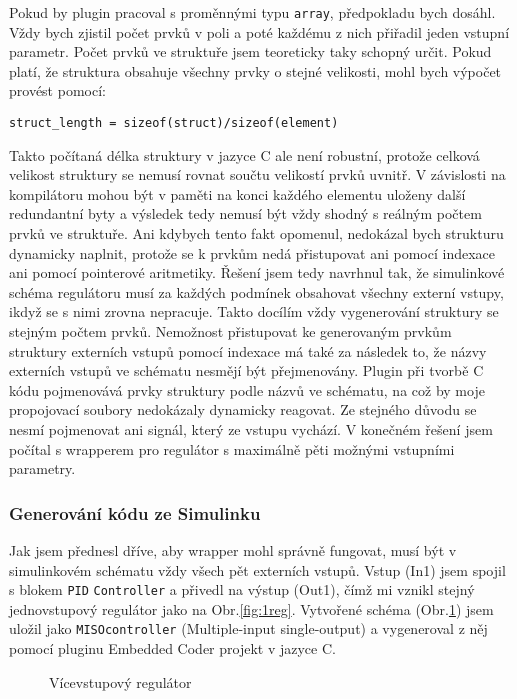 \documentclass[thesis=M,czech,hidelinks]{FITthesis}[2012/06/26]
\begin{document}
Pokud by plugin pracoval s proměnnými typu \texttt{array}, předpokladu bych dosáhl. Vždy bych zjistil počet prvků v poli a poté každému z nich přiřadil jeden vstupní parametr. Počet prvků ve struktuře jsem teoreticky taky schopný určit. Pokud platí, že struktura obsahuje všechny prvky o stejné velikosti, mohl bych výpočet provést pomocí:
\begin{lstlisting}[backgroundcolor=\color{white}, framerule=0pt]
     struct_length = sizeof(struct)/sizeof(element)
\end{lstlisting}
Takto počítaná délka struktury v jazyce C ale není robustní, protože celková velikost struktury se nemusí rovnat součtu velikostí prvků uvnitř. V závislosti na kompilátoru mohou být v paměti na konci každého elementu uloženy další redundantní byty a výsledek tedy nemusí být vždy shodný s reálným počtem prvků ve struktuře. Ani kdybych tento fakt opomenul, nedokázal bych strukturu dynamicky naplnit, protože se k prvkům nedá přistupovat ani pomocí indexace ani pomocí pointerové aritmetiky. 
Řešení jsem tedy navrhnul tak, že simulinkové schéma regulátoru musí za každých podmínek obsahovat všechny externí vstupy, ikdyž se s nimi zrovna nepracuje. Takto docílím vždy vygenerování struktury se stejným počtem prvků. Nemožnost přistupovat ke generovaným prvkům struktury externích vstupů pomocí indexace má také za následek to, že názvy externích vstupů ve schématu nesmějí být přejmenovány. Plugin při tvorbě C kódu pojmenovává prvky struktury podle názvů ve schématu, na což by moje propojovací soubory nedokázaly dynamicky reagovat. Ze stejného důvodu se nesmí pojmenovat ani signál, který ze vstupu vychází. V konečném řešení jsem počítal s wrapperem pro regulátor s maximálně pěti možnými vstupními parametry.

\subsubsection*{Generování kódu ze Simulinku}
Jak jsem přednesl dříve, aby wrapper mohl správně fungovat, musí být v simulinkovém schématu vždy všech pět externích vstupů. Vstup (In1) jsem spojil s blokem \texttt{PID} \texttt{Controller} a přivedl na výstup (Out1), čímž mi vznikl stejný jednovstupový regulátor jako na Obr.\ref{fig:1reg}. Vytvořené schéma (Obr.\ref{fig:Mreg}) jsem uložil jako \texttt{MISOcontroller} (Multiple-input single-output) a vygeneroval z něj pomocí pluginu Embedded Coder projekt v jazyce C. 
\begin{figure}[h]
        \centering
        \caption{Vícevstupový regulátor}
        \label{fig:Mreg}
\end{figure}
\end{document}
